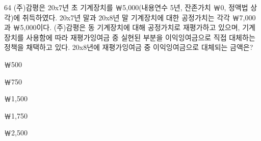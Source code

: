 \begin{question}{64}
(주)감평은 20x7년 초 기계장치를 ￦5,000(내용연수 5년, 잔존가치 ￦0, 정액법 상각)에 취득하였다. 20x7년 말과 20x8년 말 기계장치에 대한 공정가치는 각각 ￦7,000과 ￦5,000이다. (주)감평은 동 기계장치에 대해 공정가치로 재평가하고 있으며, 기계장치를 사용함에 따라 재평가잉여금 중 실현된 부분을 이익잉여금으로 직접 대체하는 정책을 채택하고 있다. 20x8년에 재평가잉여금 중 이익잉여금으로 대체되는 금액은?
\begin{choices}
  \item ￦500
  \item ￦750
  \item ￦1,500
  \item ￦1,750
  \item ￦2,500
\end{choices}
\end{question}
